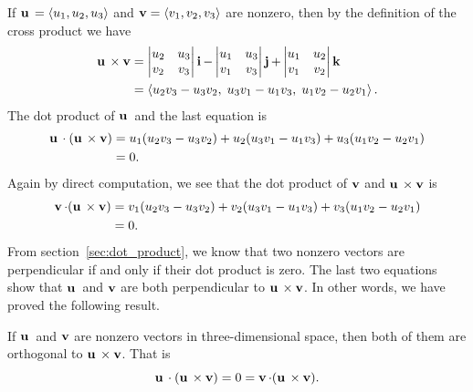 If $\operatorname*{\mathbf{u}}{} = \langle u_1, u_2, u_3 \rangle$ and
$\operatorname*{\mathbf{v}} = \langle v_1, v_2, v_3 \rangle$ are nonzero, then by the
definition of the cross product we have
%
\begin{align*}
\operatorname*{\mathbf{u}}{} \times \operatorname*{\mathbf{v}}
&=
\begin{vmatrix}
u_2 & u_3 \\
v_2 & v_3
\end{vmatrix}
\operatorname*{\mathbf{i}}
-
\begin{vmatrix}
u_1 & u_3 \\
v_1 & v_3
\end{vmatrix}
\operatorname*{\mathbf{j}}
+
\begin{vmatrix}
u_1 & u_2 \\
v_1 & v_2
\end{vmatrix}
\operatorname*{\mathbf{k}} \\
&=
\left\langle
u_2 v_3 - u_3 v_2,\; u_3 v_1 - u_1 v_3,\; u_1 v_2 - u_2 v_1
\right\rangle.
\end{align*}
%
The dot product of $\operatorname*{\mathbf{u}}{}$ and the last equation is
%
\begin{align*}
\operatorname*{\mathbf{u}}{} \cdot (\operatorname*{\mathbf{u}}{} \times \operatorname*{\mathbf{v}})
&=
u_1 ( u_2 v_3 - u_3 v_2 ) +
u_2 ( u_3 v_1 - u_1 v_3 ) +
u_3 ( u_1 v_2 - u_2 v_1 ) \\
&=
0.
\end{align*}
%
Again by direct computation, we see that the dot product of $\operatorname*{\mathbf{v}}$
and $\operatorname*{\mathbf{u}}{} \times \operatorname*{\mathbf{v}}$ is
%
\begin{align*}
\operatorname*{\mathbf{v}} \cdot (\operatorname*{\mathbf{u}}{} \times \operatorname*{\mathbf{v}})
&=
v_1 ( u_2 v_3 - u_3 v_2 ) +
v_2 ( u_3 v_1 - u_1 v_3 ) +
v_3 ( u_1 v_2 - u_2 v_1 ) \\
&=
0.
\end{align*}
%
From section~\ref{sec:dot_product}, we know that two nonzero vectors
are perpendicular if and only if their
dot product is zero. The last two equations show that $\operatorname*{\mathbf{u}}{}$ and
$\operatorname*{\mathbf{v}}$ are both perpendicular to $\operatorname*{\mathbf{u}}{} \times \operatorname*{\mathbf{v}}$. In other
words, we have proved the following result.

\begin{theorem}
\label{thm:vectors_matrices:u_v_parallel_u_dot_v}
If $\operatorname*{\mathbf{u}}{}$ and $\operatorname*{\mathbf{v}}$ are nonzero vectors in three-dimensional space,
then both of them are orthogonal to $\operatorname*{\mathbf{u}}{} \times \operatorname*{\mathbf{v}}$. That is
\[
\operatorname*{\mathbf{u}}{} \cdot (\operatorname*{\mathbf{u}}{} \times \operatorname*{\mathbf{v}})
=
0
=
\operatorname*{\mathbf{v}} \cdot (\operatorname*{\mathbf{u}}{} \times \operatorname*{\mathbf{v}}).
\]
\end{theorem}

